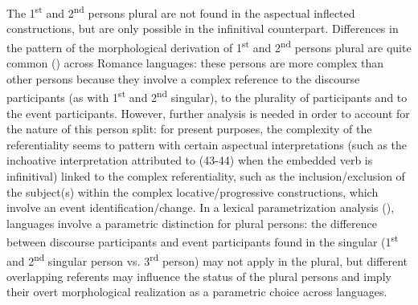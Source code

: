 \documentclass[output=paper]{langsci/langscibook}
\begin{document}
The 1\textsuperscript{st} and 2\textsuperscript{nd} persons plural are not found in the aspectual inflected constructions, but are only possible in the infinitival counterpart. Differences in the pattern of the morphological derivation of 1\textsuperscript{st} and 2\textsuperscript{nd} persons plural are quite common (\citealt{Manzini2005,Manzini2011Bio}) across Romance languages: these persons are more complex than other persons \citep{Bobaljik2008Missing} because they involve a complex reference to the discourse participants (as with 1\textsuperscript{st} and 2\textsuperscript{nd} singular), to the plurality of participants and to the event participants. However, further analysis is needed in order to account for the nature of this person split: for present purposes, the complexity of the referentiality seems to pattern with certain aspectual interpretations (such as the inchoative interpretation attributed to (43-44) when the embedded verb is infinitival) linked to the complex referentiality, such as the inclusion\slash exclusion of the subject(s) within the complex locative\slash progressive constructions, which involve an event identification\slash change. In a lexical parametrization analysis (\citealt{Manzini2011Bio}), languages involve a parametric distinction for plural persons: the difference between discourse participants and event participants found in the singular (1\textsuperscript{st} and 2\textsuperscript{nd} singular person vs. 3\textsuperscript{rd} person) may not apply in the plural, but different overlapping referents may influence the status of the plural persons and imply their overt morphological realization as a parametric choice across languages.
\end{document}
